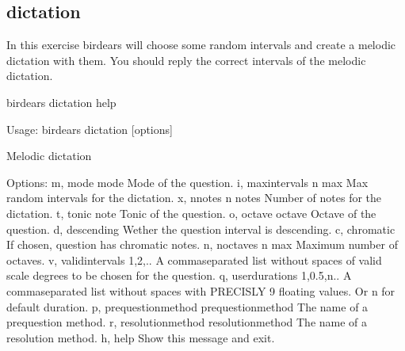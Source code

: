 \documentclass[letterpaper,10pt,english]{sphinxmanual}
\begin{document}
\subsection{dictation}
\label{\detokenize{index:dictation}}
In this exercise birdears will choose some random intervals and create a
melodic dictation with them. You should reply the correct intervals of the
melodic dictation.

\begin{sphinxVerbatim}[commandchars=\\\{\}]
birdears dictation \PYGZhy{}\PYGZhy{}help
\end{sphinxVerbatim}

\begin{sphinxVerbatim}[commandchars=\\\{\}]
Usage: birdears dictation [options]

  Melodic dictation

Options:
  \PYGZhy{}m, \PYGZhy{}\PYGZhy{}mode \PYGZlt{}mode\PYGZgt{}               Mode of the question.
  \PYGZhy{}i, \PYGZhy{}\PYGZhy{}max\PYGZus{}intervals \PYGZlt{}n max\PYGZgt{}     Max random intervals for the dictation.
  \PYGZhy{}x, \PYGZhy{}\PYGZhy{}n\PYGZus{}notes \PYGZlt{}n notes\PYGZgt{}         Number of notes for the dictation.
  \PYGZhy{}t, \PYGZhy{}\PYGZhy{}tonic \PYGZlt{}note\PYGZgt{}              Tonic of the question.
  \PYGZhy{}o, \PYGZhy{}\PYGZhy{}octave \PYGZlt{}octave\PYGZgt{}           Octave of the question.
  \PYGZhy{}d, \PYGZhy{}\PYGZhy{}descending                Wether the question interval is descending.
  \PYGZhy{}c, \PYGZhy{}\PYGZhy{}chromatic                 If chosen, question has chromatic notes.
  \PYGZhy{}n, \PYGZhy{}\PYGZhy{}n\PYGZus{}octaves \PYGZlt{}n max\PYGZgt{}         Maximum number of octaves.
  \PYGZhy{}v, \PYGZhy{}\PYGZhy{}valid\PYGZus{}intervals \PYGZlt{}1,2,..\PYGZgt{}  A comma\PYGZhy{}separated list without spaces
                                  of valid scale degrees to be chosen for the
                                  question.
  \PYGZhy{}q, \PYGZhy{}\PYGZhy{}user\PYGZus{}durations \PYGZlt{}1,0.5,n..\PYGZgt{}
                                  A comma\PYGZhy{}separated list without
                                  spaces with PRECISLY 9 floating values. Or
                                  \PYGZsq{}n\PYGZsq{} for default              duration.
  \PYGZhy{}p, \PYGZhy{}\PYGZhy{}prequestion\PYGZus{}method \PYGZlt{}prequestion\PYGZus{}method\PYGZgt{}
                                  The name of a pre\PYGZhy{}question method.
  \PYGZhy{}r, \PYGZhy{}\PYGZhy{}resolution\PYGZus{}method \PYGZlt{}resolution\PYGZus{}method\PYGZgt{}
                                  The name of a resolution method.
  \PYGZhy{}h, \PYGZhy{}\PYGZhy{}help                      Show this message and exit.


\end{sphinxVerbatim}
\end{document}

